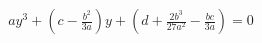 \documentclass[preview]{standalone}
\begin{document}
\begin{align*}
ay^3 + \left( c-\frac{b^2}{3a} \right) y + \left( d + \frac{2b^3}{27a^2}-\frac{bc}{3a} \right) = 0
\end{align*}
\end{document}
